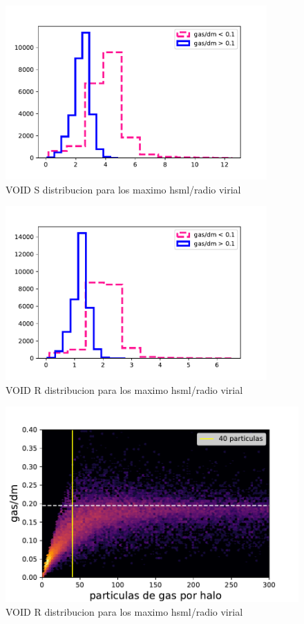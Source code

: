 \begin{figure}[h]
\centering
\includegraphics[width=10cm]{Figures/S_hsml.pdf}
\decoRule
\caption[asd]{VOID S distribucion para los maximo hsml/radio virial }
\label{fig:Electron}
\end{figure}

\begin{figure}[h]
\centering
\includegraphics[width=10cm]{Figures/R_hsml.pdf}
\decoRule
\caption[asd]{VOID R distribucion para los maximo hsml/radio virial }
\label{fig:Electron}
\end{figure}

\begin{figure}[h]
\centering
\includegraphics[width=18cm]{Figures/R_control1.pdf}
\decoRule
\caption[asd]{VOID R distribucion para los maximo hsml/radio virial }
\label{fig:Electron}
\end{figure}

